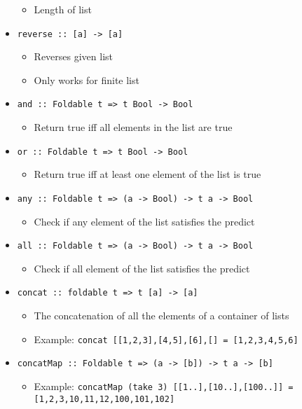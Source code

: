 \begin{itemize}
        \begin{itemize}
            \item Length of list
        \end{itemize}
    \item \verb+reverse :: [a] -> [a]+
        \begin{itemize}
            \item Reverses given list
            \item Only works for finite list
        \end{itemize}
    \item \verb+and :: Foldable t => t Bool -> Bool+
        \begin{itemize}
            \item Return true iff all elements in the list are true
        \end{itemize}
    \item \verb+or :: Foldable t => t Bool -> Bool+
        \begin{itemize}
            \item Return true iff at least one element of the list is true
        \end{itemize}
    \item \verb+any :: Foldable t => (a -> Bool) -> t a -> Bool+
        \begin{itemize}
            \item Check if any element of the list satisfies the predict
        \end{itemize}
    \item \verb+all :: Foldable t => (a -> Bool) -> t a -> Bool+
        \begin{itemize}
            \item Check if all element of the list satisfies the predict
        \end{itemize}
    \item \verb+concat :: foldable t => t [a] -> [a]+
        \begin{itemize}
            \item The concatenation of all the elements of a container of lists
            \item Example: \verb+concat [[1,2,3],[4,5],[6],[] = [1,2,3,4,5,6]+
        \end{itemize}
    \item \verb+concatMap :: Foldable t => (a -> [b]) -> t a -> [b]+
        \begin{itemize}
            \item Example: \verb+concatMap (take 3) [[1..],[10..],[100..]] = [1,2,3,10,11,12,100,101,102]+

\end{itemize}
\end{itemize}

